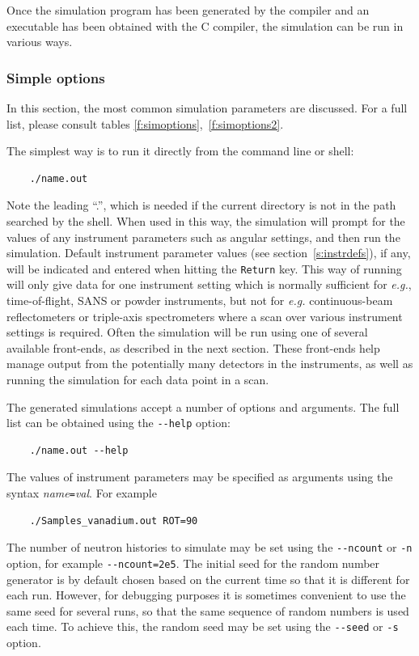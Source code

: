 Once the simulation program has been generated by the \MCS compiler \mcs
and an executable has been obtained with the C compiler, the simulation
can be run in various ways.

\subsubsection{Simple \MCS options}
In this section, the most common simulation parameters are
discussed. For a full list, please consult tables
\ref{f:simoptions},~\ref{f:simoptions2}.

The simplest way is to run it directly from the
command line or shell:
\begin{lstlisting}
    ./name.out
\end{lstlisting}
Note the leading ``.'', which is needed if the current directory is not in the
path searched by the shell. When used in this way, the simulation will prompt
for the values of any instrument parameters such as angular settings, and then
run the simulation. Default instrument parameter values (see
section~\ref{s:instrdefs}), if any, will be indicated and entered when hitting
the \verb+Return+ key. This way of
running \MCS will only give data for one instrument setting which is normally
sufficient for {\em e.g.}, time-of-flight, SANS or powder instruments, but not
for {\em e.g.} continuous-beam reflectometers or triple-axis spectrometers where
a scan over various instrument settings is required.  Often the simulation will
be run using one of several available front-ends, as described in the next
section. These front-ends help manage output from the potentially many detectors
in the instruments, as well as running the simulation for each data point in a
scan.

The generated simulations accept a number of options and arguments. The
full list can be obtained using the \verb+--help+ option:
\begin{lstlisting}
    ./name.out --help
\end{lstlisting}
The values of instrument parameters may be specified as arguments using
the syntax \textit{name}\verb+=+\textit{val}. For example
\begin{lstlisting}
    ./Samples_vanadium.out ROT=90
\end{lstlisting}
The number of neutron histories to simulate may be set using the
\verb+--ncount+ or \verb+-n+ option, for example
\verb+--ncount=2e5+. The initial seed for the random number generator is
by default chosen based on the current time so that it is different for
each run. However, for debugging purposes it is sometimes convenient to
use the same seed for several runs, so that the same sequence of random
numbers is used each time. To achieve this, the random seed may be set
using the \verb+--seed+ or \verb+-s+ option.

